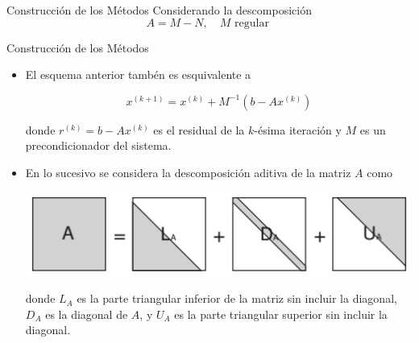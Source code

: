 \documentclass[10pt]{beamer}
\begin{document}
    \begin{frame}{Construcci\'on de los M\'etodos}
      Considerando la descomposici\'on
      $$
      A = M-N, \quad M \mbox{ regular }
      $$
      \end{frame}
      \begin{frame}{Construcci\'on de los M\'etodos}
      \begin{itemize}
       \item El esquema anterior tamb\'en es esquivalente a
      \begin{block}{}
       $$
       x^{(k+1)} = x^{(k)} + M^{-1}(b-Ax^{(k)})
       $$
      \end{block}
      donde $r^{(k)} = b-Ax^{(k)}$ es el residual de la $k$-\'esima iteraci\'on y $M$ es un precondicionador del sistema.
      \item<2-> En lo sucesivo se considera la descomposici\'on aditiva de la matriz $A$ como
      \begin{center}
      \includegraphics[scale=0.5]{descomA.png}
      \end{center}
      donde $L_A$ es la parte triangular inferior de la matriz sin incluir la diagonal, $D_A$ es la diagonal de $A$, y $U_A$ es la parte triangular superior sin incluir la diagonal.
      \end{itemize}
      \end{frame}
\end{document}
